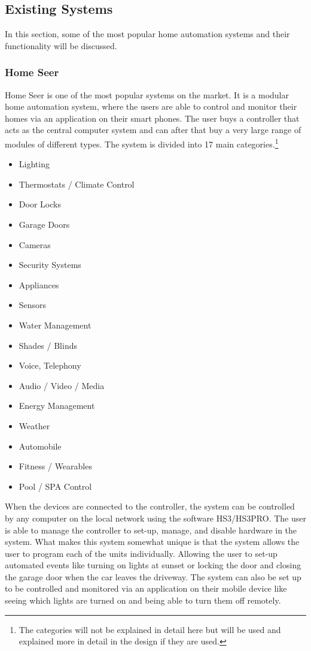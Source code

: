 \subsection{Existing Systems}
\label{sub:existingSystems}
In this section, some of the most popular home automation systems and their functionality will be discussed.

\subsubsection{Home Seer}
Home Seer is one of the most popular systems on the market. It is a modular home automation system, where the users are able to control and monitor their homes via an application on their smart phones. The user buys a controller that acts as the central computer system and can after that buy a very large range of modules of different types. The system is divided into 17 main categories.\footnote{The categories will not be explained in detail here but will be used and explained more in detail in the design if they are used.}
\begin{itemize}
	\item Lighting
	\item Thermostats / Climate Control
	\item Door Locks
	\item Garage Doors
	\item Cameras
	\item Security Systems
	\item Appliances
	\item Sensors
	\item Water Management
	\item Shades / Blinds
	\item Voice, Telephony
	\item Audio / Video / Media
	\item Energy Management
	\item Weather
	\item Automobile
	\item Fitness / Wearables
	\item Pool / SPA Control
\end{itemize}%
When the devices are connected to the controller, the system can be controlled by any computer on the local network using the software HS3/HS3PRO. The user is able to manage the controller to set-up, manage, and disable hardware in the system. What makes this system somewhat unique is that the system allows the user to program each of the units individually. Allowing the user to set-up automated events like turning on lights at sunset or locking the door and closing the garage door when the car leaves the driveway. The system can also be set up to be controlled and monitored via an application on their mobile device like seeing which lights are turned on and being able to turn them off remotely.%

